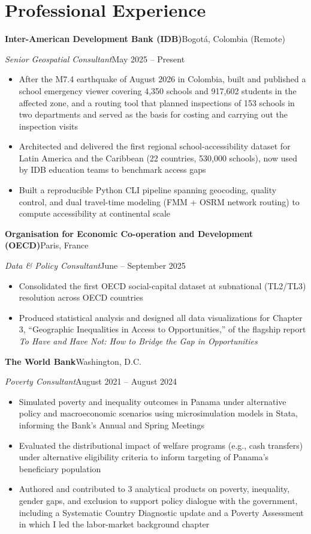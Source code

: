\documentclass[10pt]{article}
\newcommand{\org}[2]{\noindent\textbf{#1}\hfill #2\par\vspace{0pt}}
\newcommand{\role}[2]{\noindent\textit{#1}\hfill #2\par\vspace{0pt}}
\newenvironment{cvitems}{%
  \begin{itemize}[
    leftmargin=1.2em,
    itemsep=0pt,
    parsep=0pt,
    topsep=1pt,
    label={$\bullet$}]%
}{\end{itemize}}
\newcommand{\entrygap}{\vspace{6pt}}
\begin{document}
\section{Professional Experience}

\org{Inter-American Development Bank (IDB)}{Bogot\'a, Colombia (Remote)}
\role{Senior Geospatial Consultant}{May 2025 -- Present}
\vspace{-1pt}
\begin{cvitems}
  \item After the M7.4 earthquake of August 2026 in Colombia, built and published a school emergency viewer covering 4,350 schools and 917,602 students in the affected zone, and a routing tool that planned inspections of 153 schools in two departments and served as the basis for costing and carrying out the inspection visits
  \item Architected and delivered the first regional school-accessibility dataset for Latin America and the Caribbean (22 countries, 530,000 schools), now used by IDB education teams to benchmark access gaps
  \item Built a reproducible Python CLI pipeline spanning geocoding, quality control, and dual travel-time modeling (FMM + OSRM network routing) to compute accessibility at continental scale
\end{cvitems}

\entrygap
\org{Organisation for Economic Co-operation and Development (OECD)}{Paris, France}
\role{Data \& Policy Consultant}{June -- September 2025}
\vspace{-1pt}
\begin{cvitems}
  \item Consolidated the first OECD social-capital dataset at subnational (TL2/TL3) resolution across OECD countries
  \item Produced statistical analysis and designed all data visualizations for Chapter 3, ``Geographic Inequalities in Access to Opportunities,'' of the flagship report \textit{To Have and Have Not: How to Bridge the Gap in Opportunities}
\end{cvitems}

\entrygap
\org{The World Bank}{Washington, D.C.}
\role{Poverty Consultant}{August 2021 -- August 2024}
\vspace{-1pt}
\begin{cvitems}
  \item Simulated poverty and inequality outcomes in Panama under alternative policy and macroeconomic scenarios using microsimulation models in Stata, informing the Bank's Annual and Spring Meetings
  \item Evaluated the distributional impact of welfare programs (e.g., cash transfers) under alternative eligibility criteria to inform targeting of Panama's beneficiary population
  \item Authored and contributed to 3 analytical products on poverty, inequality, gender gaps, and exclusion to support policy dialogue with the government, including a Systematic Country Diagnostic update and a Poverty Assessment in which I led the labor-market background chapter
\end{cvitems}
\end{document}
